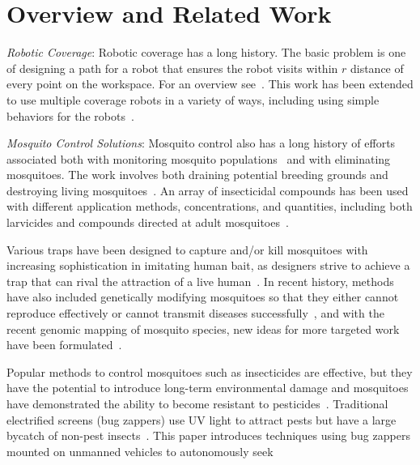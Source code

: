 \section[RelatedWork]{Overview and Related Work}
\noindent \emph{Robotic Coverage}: 
Robotic coverage has a long history. The basic problem is one of designing a path for a robot that ensures the robot visits within $r$ distance of every point on the workspace.  For an overview see~\cite{Choset2001}.  This work has been extended to use multiple coverage robots in a variety of ways, including using simple behaviors for the robots~\cite{spears2006physics,Koenig2001}.
    
\noindent  \emph{Mosquito Control Solutions}:
Mosquito control also has a long history of efforts associated both with monitoring mosquito populations~\cite{dennett2007associations} and with eliminating mosquitoes.  The work involves both draining potential breeding grounds and destroying living mosquitoes~\cite{peter2005tick}.  An array of insecticidal compounds has been used with different application methods, concentrations, and quantities, including both larvicides and compounds directed at adult mosquitoes~\cite{larvicides2005guidelines}.

Various traps have been designed to capture and/or kill mosquitoes with increasing sophistication in imitating human bait, as designers strive to achieve a trap that can rival the attraction of a live human~\cite{maliti2015development}.  In recent history, methods have also included genetically modifying mosquitoes so that they either cannot reproduce effectively or cannot transmit diseases successfully~\cite{marshall2009malaria}, and with the recent genomic mapping of mosquito species, new ideas for more targeted work have been formulated~\cite{hill2005arthropod}.

Popular methods to control mosquitoes such as insecticides are effective, but they have the potential to introduce long-term environmental damage and mosquitoes have demonstrated the ability to become resistant to pesticides~\cite{ndiath2012resistance}. Traditional electrified screens (bug zappers) use UV light to attract pests but have a large bycatch of non-pest insects~\cite{University-Of-Florida1997}. 
This paper introduces techniques using bug zappers mounted on unmanned vehicles to autonomously seek %
	
